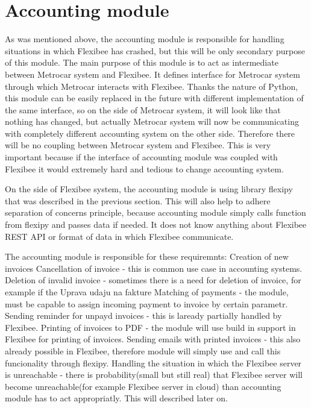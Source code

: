 \documentclass[11pt,twoside,a4paper]{book}
\begin{document}
\section{Accounting module}
As was mentioned above, the accounting module is responsible for handling situations in which Flexibee has crashed, but this will be only secondary purpose of this module. The main purpose of this module is to act as intermediate between Metrocar system and Flexibee. It defines interface for Metrocar system through which Metrocar interacts with Flexibee. Thanks the nature of Python, this module can be easily replaced in the future with different implementation of the same interface, so on the side of Metrocar system, it will look like that nothing has changed, but actually Metrocar system will now be communicating with completely different accounting system on the other side. Therefore there will be no coupling between Metrocar system and Flexibee. This is very important because if the interface of accounting module was coupled with Flexibee it would extremely hard and tedious to change accounting system. 

On the side of Flexibee system, the accounting module is using library flexipy that was described in the previous section. This will also help to adhere separation of concerns principle\cite{wiki:soc}, because accounting module simply calls function from flexipy and passes data if needed. It does not know anything about Flexibee REST API or format of data in which Flexibee communicate. 

The accounting module is responsible for these requiremnts:
Creation of new invoices
Cancellation of invoice - this is common use case in accounting systems.
Deletion of invalid invoice - sometimes there is a need for deletion of invoice, for example if the 
Uprava udaju na fakture
Matching of payments - the module, must be capable to assign incoming payment to invoice by certain parametr.
Sending reminder for unpayd invoices - this is laready partially handled by Flexibee.
Printing of invoices to PDF - the module will use build in support in Flexibee for printing of invoices.
Sending emails with printed invoices - this also already possible in Flexibee, therefore module will simply use and call this funcionality through flexipy.
Handling the situation in which the Flexibee server is unreachable - there is probability(small but still real) that Flexibee server will become unreachable(for example Flexibee server in cloud) than accounting module has to act appropriatly. This will described later on. 
\end{document}
